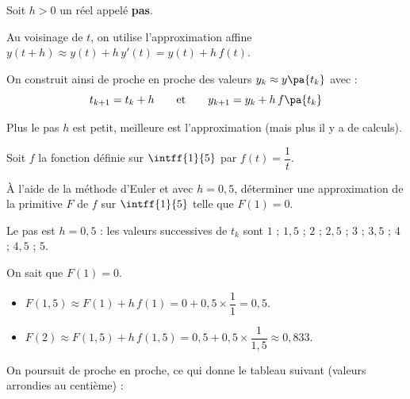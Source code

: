 \begin{prop}
	Soit $h > 0$ un réel appelé \textbf{pas}.

	Au voisinage de $t$, on utilise l'approximation affine $y(t + h) \approx y(t) + h\,y'(t) = y(t) + h\,f(t)$.

	On construit ainsi de proche en proche des valeurs $y_k \approx y\pa{t_k}$ avec :
	\[
		t_{k+1} = t_k + h \qquad\text{et}\qquad y_{k+1} = y_k + h\,f\pa{t_k}
	\]
\end{prop}

\begin{rem}
	Plus le pas $h$ est petit, meilleure est l'approximation (mais plus il y a de calculs).
\end{rem}

\newpage

\begin{methode}
	Soit $f$ la fonction définie sur $\intff{1}{5}$ par $f(t) = \dfrac{1}{t}$.

	À l'aide de la méthode d'Euler et avec $h=0{,}5$, déterminer une approximation de la primitive $F$ de $f$ sur $\intff{1}{5}$ telle que $F(1) = 0$.

	\begin{correction}
		Le pas est $h = 0{,}5$ : les valeurs successives de $t_k$ sont $1$ ; $1{,}5$ ; $2$ ; $2{,}5$ ; $3$ ; $3{,}5$ ; $4$ ; $4{,}5$ ; $5$.

		On sait que $F(1) = 0$.

		\begin{itemize}
			\item $F(1{,}5) \approx F(1) + h\,f(1) = 0 + 0{,}5 \times \dfrac{1}{1} = 0{,}5$.
			\item $F(2) \approx F(1{,}5) + h\,f(1{,}5) = 0{,}5 + 0{,}5 \times \dfrac{1}{1{,}5} \approx 0{,}833$.
		\end{itemize}

		On poursuit de proche en proche, ce qui donne le tableau suivant (valeurs arrondies au centième) :


\end{correction}
\end{methode}
